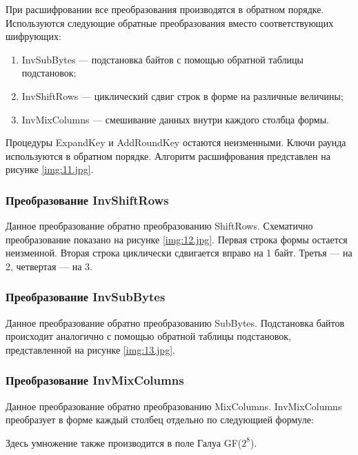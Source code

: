 При расшифровании все преобразования производятся в обратном порядке. Используются следующие обратные преобразования вместо соответствующих шифрующих:

\begin{enumerate}
	\item InvSubBytes — подстановка байтов с помощью обратной таблицы подстановок;
	\item InvShiftRows — циклический сдвиг строк в форме на различные величины;
	\item InvMixColumns — смешивание данных внутри каждого столбца формы.
\end{enumerate}

Процедуры ExpandKey и AddRoundKey остаются неизменными. Ключи раунда используются в обратном порядке.
Алгоритм расшифрования представлен на рисунке \ref{img:11.jpg}.

\subsubsection*{Преобразование InvShiftRows}

Данное преобразование обратно преобразованию ShiftRows. Схематично преобразование показано на рисунке \ref{img:12.jpg}.
Первая строка формы остается неизменной. Вторая строка циклически сдвигается вправо на 1 байт. Третья — на 2, четвертая — на 3.


\subsubsection*{Преобразование InvSubBytes}

Данное преобразование обратно преобразованию SubBytes. Подстановка байтов происходит аналогично с помощью обратной таблицы подстановок, представленной на рисунке \ref{img:13.jpg}.


\subsubsection*{Преобразование InvMixColumns}

Данное преобразование обратно преобразованию MixColumns. InvMixColumns преобразует в форме каждый столбец отдельно по следующией формуле:


Здесь умножение также производится в поле Галуа GF($2^8$).

